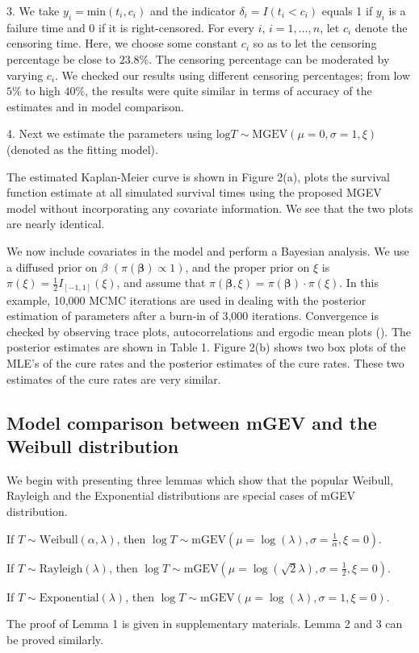 \documentclass[smallextended]{svjour3}       %
\begin{document}
{3. We take $y_{i}=\mbox{min}(t_{i},c_{i})$ and the indicator $\delta_{i}=I(t_{i}<c_{i})$
equals 1 if $y_{i}$ is a failure time and 0 if it is right-censored. For every $i$, $i=1,...,n$, let $c_{i}$ denote the censoring time. Here, we choose some constant $c_{i}$ so as to let the censoring percentage be close to $23.8\%$. The censoring percentage can be moderated by varying $c_i$. We checked our results using different censoring percentages; from low $5\%$ to high $40\%$, the results were quite similar in terms of accuracy of the estimates and in model comparison. 

4. Next we estimate the parameters using $\mbox{log}T\sim\mbox{MGEV}(\mu=0,\sigma=1,\xi)$
(denoted as the fitting model).

The estimated Kaplan-Meier curve is shown in Figure 2(a), plots the survival function estimate at all simulated survival times using the proposed MGEV model without incorporating any covariate information. We see that the two plots are nearly identical.

We now include covariates in the model and perform a Bayesian analysis. We use a diffused prior on $\beta$ $(\pi(\mathbf{\beta})\varpropto1)$,
and the proper prior on $\xi$ is $\pi(\xi)=\frac{1}{2}I_{[-1,1]}(\xi)$, and assume that $\pi(\mathbf{\beta},\xi)=\pi(\mathbf{\beta})\cdot\pi(\xi)$.
In this example, 10,000 MCMC iterations are used in dealing with the posterior estimation of parameters after a burn-in of 3,000 iterations. Convergence is checked by observing trace plots, autocorrelations and ergodic mean plots (\citet{junk:patz:2013}). The posterior estimates are shown in Table 1. Figure 2(b) shows two box plots of the MLE's of the cure rates and the
posterior estimates of the cure rates. These two estimates of the cure rates are very similar. 

\subsection{Model comparison between mGEV and the Weibull distribution}
We begin with presenting three lemmas which show that the popular Weibull, Rayleigh and the Exponential distributions are special cases of mGEV distribution.
\begin{lemma}
If $T\sim\mbox{Weibull}(\alpha,\lambda)$, then $\log T\sim\mbox{mGEV}(\mu=\log(\lambda),\sigma=\frac{1}{\alpha},\xi=0).$
\end{lemma}\label{lem1}
\begin{lemma}
If $T\sim\mbox{Rayleigh}(\lambda)$, then $\log T\sim\mbox{mGEV}(\mu=\log(\sqrt{2}\lambda),\sigma=\frac{1}{2}, \xi=0).$
\end{lemma}
\begin{lemma}
If $T\sim\mbox{Exponential}(\lambda)$, then $\log T\sim\mbox{mGEV}(\mu=\log(\lambda),\sigma=1,\xi=0).$
\end{lemma}
The proof of Lemma 1 is given in supplementary materials. Lemma 2 and 3 can be proved similarly. 


}
\end{document}
